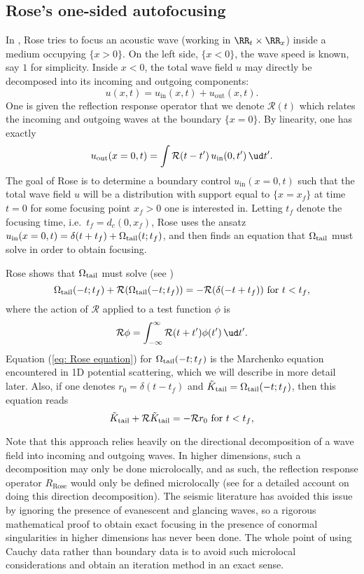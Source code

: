 \documentclass[10pt]{article}
\theoremstyle{plain}
\theoremstyle{definition}
\theoremstyle{remark}
\numberwithin{theorem}{section}
\numberwithin{example}{section}
\numberwithin{equation}{section}
\numberwithin{figure}{section}
\def\beq{\begin{equation} }
\def\eeq{\end{equation}}
\def \R{\mathcal{R}}
\newcommand\tail{_{\textup{tail}}}
\begin{document}
\subsection{Rose's one-sided autofocusing} \label{sec Rose autofocusing}
In \cite{Rose02}, Rose tries to focus an acoustic wave (working in $\RR_t \times \RR_x$) inside a medium occupying $\{ x > 0 \}.$ On the left side, $\{ x < 0 \}$, the wave speed is known, say $1$ for simplicity. Inside $x<0$, the total wave field $u$ may directly be decomposed into its incoming and outgoing components:
$$ u(x,t) = u_{\text{in}}(x,t) + u_{\text{out}}(x,t).$$
One is given the reflection response operator that we denote $\R(t)$ which relates the incoming and outgoing waves at the boundary $\{x=0\}$. By linearity, one has exactly
$$ u_{\text{out}}(x=0,t) = \int \R(t-t')\,u_{\text{in}}(0,t')\,\ud t'.$$
The goal of Rose is to determine a boundary control $u_{\text{in}}(x=0,t)$ such that the total wave field $u$ will be a distribution with support equal to $\{ x = x_f\}$ at time $t=0$ for some focusing point $x_f > 0$ one is interested in. Letting $t_f$ denote the focusing time, i.e.~$t_f = d_c(0,x_f)$, Rose uses the ansatz $u_{\text{in}}(x=0,t) = \delta(t+t_f) + \Omega\tail(t;t_f)$, and then finds an equation that $\Omega\tail$ must solve in order to obtain focusing.

Rose shows that $\Omega\tail$ must solve (see \cite[Equation (8)]{Rose02})
\beq{ \label{eq: Rose equation}
\Omega\tail(-t;t_f) + \R(\Omega\tail(-t;t_f)) = -\R(\delta(-t+t_f)) \text{ for }t<t_f,
}\eeq
where the action of $\R$ applied to a test function $\phi$ is
\beq{
\R\phi = \int_{-\infty}^{\infty}\R(t+t')\phi(t')\,\ud t'.
}\eeq
Equation (\ref{eq: Rose equation}) for $\Omega\tail(-t;t_f)$ is the Marchenko equation encountered in 1D potential scattering, which we will describe in more detail later. Also, if one denotes $r_0 = \delta(t-t_f)$ and $\tilde{K}\tail = \Omega\tail(-t;t_f)$,
then this equation reads
$$ \tilde{K}\tail + \R \tilde{K}\tail = -\R r_0 \text{ for } t< t_f,$$

Note that this approach relies heavily on the directional decomposition of a wave field into incoming and outgoing waves. In higher dimensions, such a decomposition may only be done microlocally, and as such, the reflection response operator $R_{\text{Rose}}$ would only be defined microlocally (see \cite{Stolk04} for a detailed account on doing this direction decomposition). The seismic literature has avoided this issue by ignoring the presence of evanescent and glancing waves, so a rigorous mathematical proof to obtain exact focusing in the presence of conormal singularities in higher dimensions has never been done. The whole point of using Cauchy data rather than boundary data is to avoid such microlocal considerations and obtain an iteration method in an exact sense.
\end{document}

